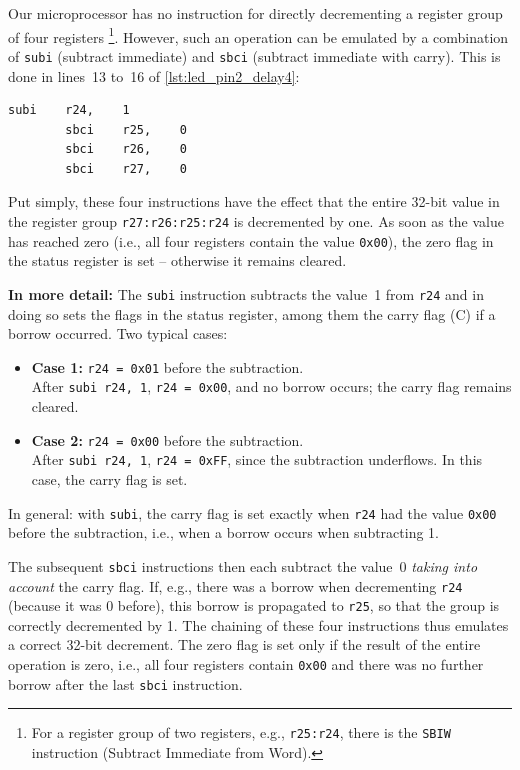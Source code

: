 \documentclass[a4paper,12pt]{article}
\begin{document}
\newpage
\noindent
Our microprocessor has no instruction for directly decrementing a register
group of four registers%
\footnote{For a register group of two registers,
e.g., \texttt{r25:r24}, there is the \texttt{SBIW} instruction
(Subtract Immediate from Word).}.
However, such an operation can be emulated by a combination of \texttt{subi}
(subtract immediate) and \texttt{sbci} (subtract immediate with carry).
This is done in lines~13 to~16
of \autoref{lst:led_pin2_delay4}:

\begin{lstlisting}[language={},numbers=none]
        subi    r24,    1
        sbci    r25,    0
        sbci    r26,    0
        sbci    r27,    0
\end{lstlisting}

\noindent
Put simply, these four instructions have the effect that the entire 32-bit
value in the register group \texttt{r27:r26:r25:r24} is decremented by one.
As soon as the value has reached zero (i.e., all four registers contain the
value \texttt{0x00}), the zero flag in the status register is set –
otherwise it remains cleared.

\vspace{1em}
\noindent
\textbf{In more detail:} The \texttt{subi} instruction subtracts the
value~1 from \texttt{r24} and in doing so sets the flags in the status
register, among them the carry flag (C) if a borrow occurred. Two typical
cases:
\begin{itemize}
    \item
	\textbf{Case 1:} \texttt{r24 = 0x01} before the subtraction.\\
	After \texttt{subi r24, 1}, \texttt{r24 = 0x00}, and no borrow
	occurs; the carry flag remains cleared.
    \item
	\textbf{Case 2:} \texttt{r24 = 0x00} before the subtraction.\\
	After \texttt{subi r24, 1}, \texttt{r24 = 0xFF}, since the
	subtraction underflows. In this case, the carry flag is set.
\end{itemize}
In general: with \texttt{subi}, the carry flag is set exactly when
\texttt{r24} had the value \texttt{0x00} before the subtraction, i.e., when a
borrow occurs when subtracting 1.

The subsequent \texttt{sbci} instructions then each subtract the value~0
\emph{taking into account} the carry flag. If, e.g., there was a borrow when
decrementing \texttt{r24} (because it was 0 before), this borrow is
propagated to \texttt{r25}, so that the group is correctly decremented by 1.
The chaining of these four instructions thus emulates a correct 32-bit
decrement.
The zero flag is set only if the result of the entire operation is zero,
i.e., all four registers contain \texttt{0x00} and there was no further
borrow after the last \texttt{sbci} instruction.
\end{document}
